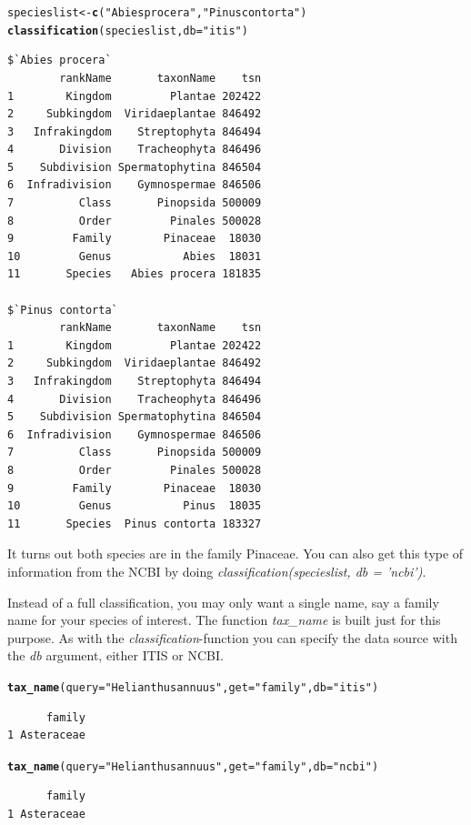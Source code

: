 \documentclass[10pt]{article}\usepackage[]{graphicx}\usepackage[]{color}
\makeatletter
\newcommand{\hlfunctioncall}[1]{\textcolor[rgb]{0.501960784313725,0,0.329411764705882}{\textbf{#1}}}%
\newcommand{\hlstring}[1]{\textcolor[rgb]{0.6,0.6,1}{#1}}%
\newenvironment{kframe}{%
 \def\at@end@of@kframe{}%
 \ifinner\ifhmode%
  \def\at@end@of@kframe{\end{minipage}}%
  \begin{minipage}{\columnwidth}%
 \fi\fi%
 \def\FrameCommand##1{\hskip\@totalleftmargin \hskip-\fboxsep
 \colorbox{shadecolor}{##1}\hskip-\fboxsep
     \hskip-\linewidth \hskip-\@totalleftmargin \hskip\columnwidth}%
 \MakeFramed {\advance\hsize-\width
   \@totalleftmargin\z@ \linewidth\hsize
   \@setminipage}}%
 {\par\unskip\endMakeFramed%
 \at@end@of@kframe}
\newenvironment{knitrout}{}{} %
\makeatother
\begin{document}
\begin{knitrout}
\color{fgcolor}\begin{kframe}
\begin{alltt}
specieslist <- \hlfunctioncall{c}(\hlstring{"Abies procera"}, \hlstring{"Pinus contorta"})
\hlfunctioncall{classification}(specieslist, db = \hlstring{"itis"})
\end{alltt}
\begin{verbatim}
$`Abies procera`
        rankName       taxonName    tsn
1        Kingdom         Plantae 202422
2     Subkingdom  Viridaeplantae 846492
3   Infrakingdom    Streptophyta 846494
4       Division    Tracheophyta 846496
5    Subdivision Spermatophytina 846504
6  Infradivision    Gymnospermae 846506
7          Class       Pinopsida 500009
8          Order         Pinales 500028
9         Family        Pinaceae  18030
10         Genus           Abies  18031
11       Species   Abies procera 181835

$`Pinus contorta`
        rankName       taxonName    tsn
1        Kingdom         Plantae 202422
2     Subkingdom  Viridaeplantae 846492
3   Infrakingdom    Streptophyta 846494
4       Division    Tracheophyta 846496
5    Subdivision Spermatophytina 846504
6  Infradivision    Gymnospermae 846506
7          Class       Pinopsida 500009
8          Order         Pinales 500028
9         Family        Pinaceae  18030
10         Genus           Pinus  18035
11       Species  Pinus contorta 183327
\end{verbatim}
\end{kframe}
\end{knitrout}


It turns out both species are in the family Pinaceae. You can also get this type of information from the NCBI by doing \emph{classification(specieslist, db = 'ncbi')}.

Instead of a full classification, you may only want a single name, say a family name for your species of interest. The function \emph{tax\_name} is built just for this purpose. As with the \emph{classification}-function you can specify the data source with the \emph{db} argument, either ITIS or NCBI. 

\begin{knitrout}
\color{fgcolor}\begin{kframe}
\begin{alltt}
\hlfunctioncall{tax_name}(query = \hlstring{"Helianthus annuus"}, get = \hlstring{"family"}, db = \hlstring{"itis"})
\end{alltt}
\begin{verbatim}
      family
1 Asteraceae
\end{verbatim}
\begin{alltt}
\hlfunctioncall{tax_name}(query = \hlstring{"Helianthus annuus"}, get = \hlstring{"family"}, db = \hlstring{"ncbi"})
\end{alltt}
\begin{verbatim}
      family
1 Asteraceae
\end{verbatim}
\end{kframe}
\end{knitrout}
\end{document}
